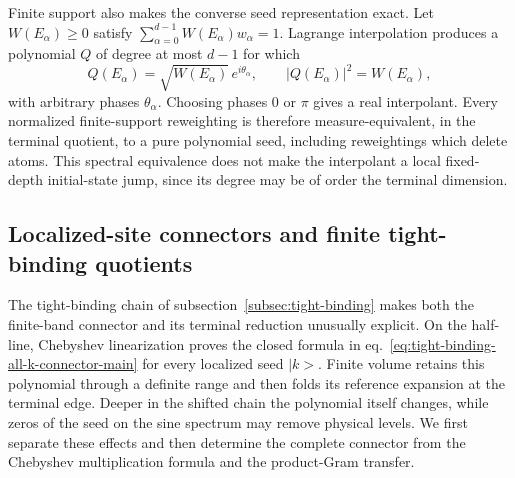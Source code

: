 \documentclass[a4paper,11pt]{article}
\def\ket#1{|#1>}%
\def\ii{i}%
\def\ee{e}%
\theoremstyle{definition}
\theoremstyle{remark}
\newcommand{\ket}[1]{|#1\rangle}
\newcommand{\ii}{\mathrm i}
\newcommand{\ee}{\mathrm e}
\begin{document}
Finite support also makes the converse seed representation exact.  Let
$W(E_\alpha)\ge0$ satisfy
$\sum_{\alpha=0}^{d-1}W(E_\alpha)w_\alpha=1$.  Lagrange interpolation
produces a polynomial $Q$ of degree at most $d-1$ for which
\begin{equation}
   Q(E_\alpha)
   =\sqrt{W(E_\alpha)}\,\ee^{\ii\theta_\alpha},
   \qquad
   |Q(E_\alpha)|^2=W(E_\alpha),
   \label{eq:finite-pure-seed-interpolation-app}
\end{equation}
with arbitrary phases $\theta_\alpha$. Choosing phases $0$ or $\pi$
gives a real interpolant.  Every normalized finite-support reweighting
is therefore measure-equivalent, in the terminal quotient, to a pure
polynomial seed, including reweightings which delete atoms.  This
spectral equivalence does not make the interpolant a local fixed-depth initial-state jump, since its degree may be of order the terminal dimension.

\subsection{Localized-site connectors and finite tight-binding quotients}
\label{app:finite-tight-binding-checks}

The tight-binding chain of subsection~\ref{subsec:tight-binding} makes both the finite-band connector and its
terminal reduction unusually explicit.  On the half-line, Chebyshev
linearization proves the closed formula in
eq.~\eqref{eq:tight-binding-all-k-connector-main} for every localized
seed $\ket k$.  Finite volume retains this polynomial through a definite
range and then folds its reference expansion at the terminal edge.
Deeper in the shifted chain the polynomial itself changes, while zeros
of the seed on the sine spectrum may remove physical levels.  We first
separate these effects and then determine the complete connector from
the Chebyshev multiplication formula and the product-Gram transfer.
\end{document}
